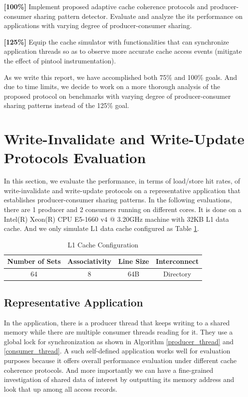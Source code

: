 \documentclass[11pt,conference]{IEEEtran}
\begin{document}
\textbf{[100\%]} Implement proposed adaptive cache coherence protocols and producer-consumer sharing pattern detector. Evaluate and analyze the its performance on applications with varying degree of producer-consumer sharing.

\textbf{[125\%]} Equip the cache simulator with functionalities that can synchronize application threads so as to observe more accurate cache access events (mitigate the effect of pintool instrumentation).

As we write this report, we have accomplished both 75\% and 100\% goals. And due to time limits, we decide to work on a more thorough analysis of the proposed protocol on benchmarks with varying degree of producer-consumer sharing patterns instead of the 125\% goal.


\section{Write-Invalidate and Write-Update Protocols Evaluation}
In this section, we evaluate the performance, in terms of load/store hit rates, of write-invalidate and write-update protocols on a representative application that establishes producer-consumer sharing patterns. In the following evaluations, there are 1 producer and 2 consumers running on different cores. It is done on a Intel(R) Xeon(R) CPU E5-1660 v4 @ 3.20GHz machine with 32KB L1 data cache. And we only simulate L1 data cache configured as Table \ref{l1_cache_config_1}.

\begin{table}[!h]
\renewcommand{\arraystretch}{2.5}
\caption{L1 Cache Configuration}
\label{l1_cache_config_1}
\centering
\begin{tabular}{|c|c|c|c|}
\hline
Number of Sets & Associativity & Line Size & Interconnect \\
\hline
64 & 8 & 64B & Directory \\
\hline
\end{tabular}
\end{table}
\FloatBarrier

\subsection{Representative Application}
In the application, there is a producer thread that keeps writing to a shared memory while there are multiple consumer threads reading for it. They use a global lock for synchronization as shown in Algorithm \ref{producer_thread} and \ref{consumer_thread}. A such self-defined application works well for evaluation purposes because it offers overall performance evaluation under different cache coherence protocols. And more importantly we can have a fine-grained investigation of shared data of interest by outputting its memory address and look that up among all access records.
\end{document}
